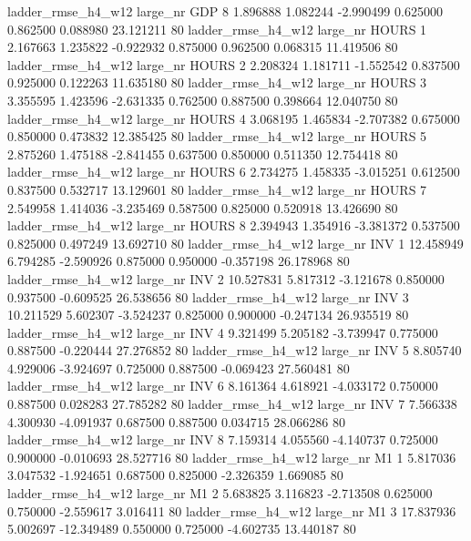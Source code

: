  ladder_rmse_h4_w12   large_nr      GDP                 8  1.896888  1.082244  -2.990499 0.625000 0.862500  0.088980   23.121211 80
 ladder_rmse_h4_w12   large_nr    HOURS                 1  2.167663  1.235822  -0.922932 0.875000 0.962500  0.068315   11.419506 80
 ladder_rmse_h4_w12   large_nr    HOURS                 2  2.208324  1.181711  -1.552542 0.837500 0.925000  0.122263   11.635180 80
 ladder_rmse_h4_w12   large_nr    HOURS                 3  3.355595  1.423596  -2.631335 0.762500 0.887500  0.398664   12.040750 80
 ladder_rmse_h4_w12   large_nr    HOURS                 4  3.068195  1.465834  -2.707382 0.675000 0.850000  0.473832   12.385425 80
 ladder_rmse_h4_w12   large_nr    HOURS                 5  2.875260  1.475188  -2.841455 0.637500 0.850000  0.511350   12.754418 80
 ladder_rmse_h4_w12   large_nr    HOURS                 6  2.734275  1.458335  -3.015251 0.612500 0.837500  0.532717   13.129601 80
 ladder_rmse_h4_w12   large_nr    HOURS                 7  2.549958  1.414036  -3.235469 0.587500 0.825000  0.520918   13.426690 80
 ladder_rmse_h4_w12   large_nr    HOURS                 8  2.394943  1.354916  -3.381372 0.537500 0.825000  0.497249   13.692710 80
 ladder_rmse_h4_w12   large_nr      INV                 1 12.458949  6.794285  -2.590926 0.875000 0.950000 -0.357198   26.178968 80
 ladder_rmse_h4_w12   large_nr      INV                 2 10.527831  5.817312  -3.121678 0.850000 0.937500 -0.609525   26.538656 80
 ladder_rmse_h4_w12   large_nr      INV                 3 10.211529  5.602307  -3.524237 0.825000 0.900000 -0.247134   26.935519 80
 ladder_rmse_h4_w12   large_nr      INV                 4  9.321499  5.205182  -3.739947 0.775000 0.887500 -0.220444   27.276852 80
 ladder_rmse_h4_w12   large_nr      INV                 5  8.805740  4.929006  -3.924697 0.725000 0.887500 -0.069423   27.560481 80
 ladder_rmse_h4_w12   large_nr      INV                 6  8.161364  4.618921  -4.033172 0.750000 0.887500  0.028283   27.785282 80
 ladder_rmse_h4_w12   large_nr      INV                 7  7.566338  4.300930  -4.091937 0.687500 0.887500  0.034715   28.066286 80
 ladder_rmse_h4_w12   large_nr      INV                 8  7.159314  4.055560  -4.140737 0.725000 0.900000 -0.010693   28.527716 80
 ladder_rmse_h4_w12   large_nr       M1                 1  5.817036  3.047532  -1.924651 0.687500 0.825000 -2.326359    1.669085 80
 ladder_rmse_h4_w12   large_nr       M1                 2  5.683825  3.116823  -2.713508 0.625000 0.750000 -2.559617    3.016411 80
 ladder_rmse_h4_w12   large_nr       M1                 3 17.837936  5.002697 -12.349489 0.550000 0.725000 -4.602735   13.440187 80
